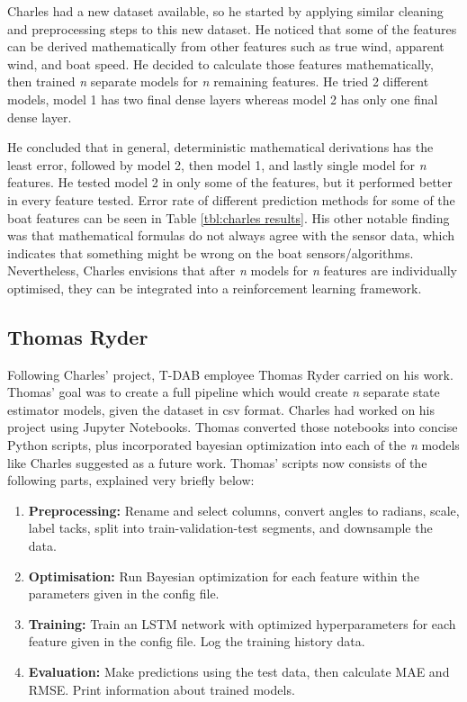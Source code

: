 \documentclass[12pt,twoside]{report}
\begin{document}
Charles had a new dataset available, so he started by applying similar cleaning and preprocessing steps to this new dataset. He noticed that some of the features can be derived mathematically from other features such as true wind, apparent wind, and boat speed. He decided to calculate those features mathematically, then trained \emph{n} separate models for \emph{n} remaining features. He tried 2 different models, model 1 has two final dense layers whereas model 2 has only one final dense layer.

He concluded that in general, deterministic mathematical derivations has the least error, followed by model 2, then model 1, and lastly single model for \emph{n} features. He tested model 2 in only some of the features, but it performed better in every feature tested. Error rate of different prediction methods for some of the boat features can be seen in Table \ref{tbl:charles results}. His other notable finding was that mathematical formulas do not always agree with the sensor data, which indicates that something might be wrong on the boat sensors/algorithms. Nevertheless, Charles envisions that after \emph{n} models for \emph{n} features are individually optimised, they can be integrated into a reinforcement learning framework.

\subsection{Thomas Ryder}

Following Charles' project, T-DAB employee Thomas Ryder carried on his work. Thomas' goal was to create a full pipeline which would create \emph{n} separate state estimator models, given the dataset in csv format. Charles had worked on his project using Jupyter Notebooks. Thomas converted those notebooks into concise Python scripts, plus incorporated bayesian optimization into each of the \emph{n} models like Charles suggested as a future work. Thomas' scripts now consists of the following parts, explained very briefly below:

\begin{enumerate}
  \item \textbf{Preprocessing:} Rename and select columns, convert angles to radians, scale, label tacks, split into train-validation-test segments, and downsample the data.
  \item \textbf{Optimisation:} Run Bayesian optimization for each feature within the parameters given in the config file.
  \item \textbf{Training:} Train an LSTM network with optimized hyperparameters for each feature given in the config file. Log the training history data.
  \item \textbf{Evaluation:} Make predictions using the test data, then calculate MAE and RMSE. Print information about trained models.
\end{enumerate}
\end{document}

